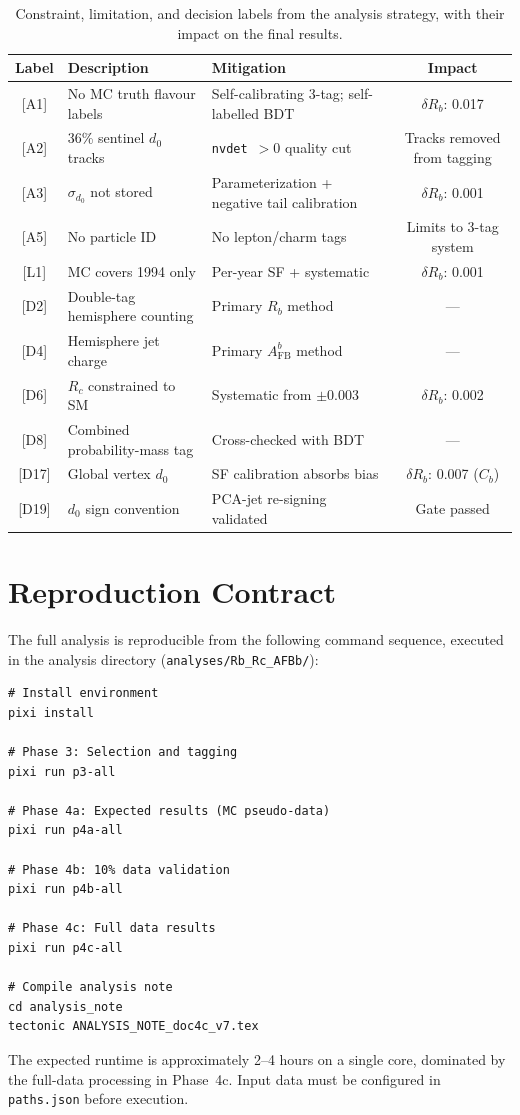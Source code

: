 \documentclass[11pt,a4paper]{article}
\begin{document}
\begin{table}[htbp]
\centering
\caption{Constraint, limitation, and decision labels from the analysis
  strategy, with their impact on the final results.}
\label{tbl:limitation-index}
\begin{tabular}{cp{5cm}p{5cm}c}
\toprule
Label & Description & Mitigation & Impact \\
\midrule
{[A1]} & No MC truth flavour labels & Self-calibrating 3-tag; self-labelled BDT & $\delta R_b$: 0.017 \\
{[A2]} & 36\% sentinel $d_0$ tracks & \texttt{nvdet}~$>0$ quality cut & Tracks removed from tagging \\
{[A3]} & $\sigma_{d_0}$ not stored & Parameterization + negative tail calibration & $\delta R_b$: 0.001 \\
{[A5]} & No particle ID & No lepton/charm tags & Limits to 3-tag system \\
{[L1]} & MC covers 1994 only & Per-year SF + systematic & $\delta R_b$: 0.001 \\
{[D2]} & Double-tag hemisphere counting & Primary $R_b$ method & --- \\
{[D4]} & Hemisphere jet charge & Primary $A_\mathrm{FB}^b$ method & --- \\
{[D6]} & $R_c$ constrained to SM & Systematic from $\pm$0.003 & $\delta R_b$: 0.002 \\
{[D8]} & Combined probability-mass tag & Cross-checked with BDT & --- \\
{[D17]} & Global vertex $d_0$ & SF calibration absorbs bias & $\delta R_b$: 0.007 ($C_b$) \\
{[D19]} & $d_0$ sign convention & PCA-jet re-signing validated & Gate passed \\
\bottomrule
\end{tabular}
\end{table}

\section{Reproduction Contract}
\label{app:reproduction}

The full analysis is reproducible from the following command sequence,
executed in the analysis directory
(\texttt{analyses/Rb\_Rc\_AFBb/}):

\begin{verbatim}
# Install environment
pixi install

# Phase 3: Selection and tagging
pixi run p3-all

# Phase 4a: Expected results (MC pseudo-data)
pixi run p4a-all

# Phase 4b: 10% data validation
pixi run p4b-all

# Phase 4c: Full data results
pixi run p4c-all

# Compile analysis note
cd analysis_note
tectonic ANALYSIS_NOTE_doc4c_v7.tex
\end{verbatim}

The expected runtime is approximately 2--4 hours on a single core,
dominated by the full-data processing in Phase~4c.  Input data must be
configured in \texttt{paths.json} before execution.
\end{document}
